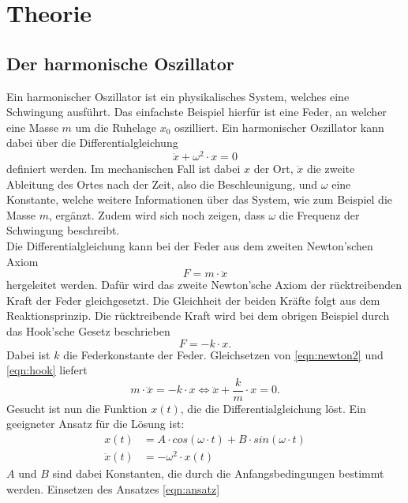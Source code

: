 \section{Theorie}
\label{sec:Theorie}
\subsection{Der harmonische Oszillator}
Ein harmonischer Oszillator ist ein physikalisches System, welches eine Schwingung ausführt. Das einfachste Beispiel
hierfür ist eine Feder, an welcher eine Masse  $m$ um die Ruhelage $x_0$ oszilliert.
Ein harmonischer Oszillator kann dabei über die Differentialgleichung
\begin{equation}
    \ddot{x}+\omega^2\cdot x=0 \label{eqn:harmOsz}
\end{equation}
definiert werden. Im mechanischen Fall ist dabei $x$ der Ort, $\ddot{x}$ die zweite Ableitung des Ortes nach der Zeit,
also die Beschleunigung, und $\omega$ eine Konstante, welche weitere Informationen über das System, wie zum Beispiel die
Masse $m$, ergänzt. Zudem wird sich noch zeigen, dass $\omega$ die Frequenz der Schwingung beschreibt.
\\
Die Differentialgleichung kann bei der Feder aus dem zweiten Newton'schen Axiom
\begin{equation}
    F=m\cdot\ddot{x} \label{eqn:newton2}
\end{equation}
hergeleitet werden. Dafür wird das zweite Newton'sche Axiom der rücktreibenden Kraft der Feder gleichgesetzt. Die
Gleichheit der beiden Kräfte folgt aus dem Reaktionsprinzip. Die rücktreibende Kraft wird bei dem obrigen Beispiel
durch das Hook'sche Gesetz beschrieben
\begin{equation}
    F=-k\cdot x \label{eqn:hook}.
\end{equation}
Dabei ist $k$ die Federkonstante der Feder.
Gleichsetzen von \eqref{eqn:newton2} und \eqref{eqn:hook} liefert
\begin{equation}
    m\cdot\dddot{x}=-k\cdot x \Leftrightarrow \ddot{x}+\frac{k}{m}\cdot x=0 \label{eqn:dgl}.
\end{equation}
Gesucht ist nun die Funktion $x(t)$, die die Differentialgleichung löst. Ein geeigneter Ansatz für die Lösung ist:
\begin{align}
    x(t)&=A\cdot cos(\omega\cdot t)+B\cdot sin(\omega\cdot t) \\
    \ddot{x}(t)&=-\omega^2\cdot x(t)
    \label{eqn:ansatz}
\end{align}
$A$ und $B$ sind dabei Konstanten, die durch die Anfangsbedingungen bestimmt werden. Einsetzen des Ansatzes \eqref{eqn:ansatz}
